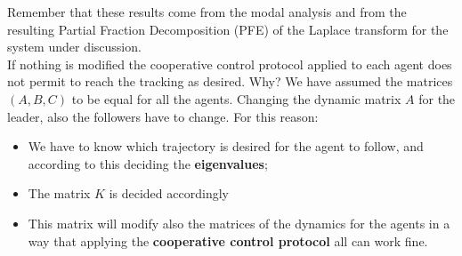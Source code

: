 Remember that these results come from the modal analysis and from the resulting Partial Fraction Decomposition (PFE) of the Laplace transform for the system under discussion.\\

If nothing is modified the cooperative control protocol applied to each agent does not permit to reach the tracking as desired. Why? We have assumed the matrices $(A,B,C)$ to be equal for all the agents. Changing the dynamic matrix $A$ for the leader, also the followers have to change. For this reason:
\begin{itemize}
    \item We have to know which trajectory is desired for the agent to follow, and according to this deciding the \textbf{eigenvalues};
    \item The matrix $K$ is decided accordingly
    \item This matrix will modify also the matrices of the dynamics for the agents in a way that applying the \textbf{cooperative control protocol} all can work fine.
\end{itemize}

